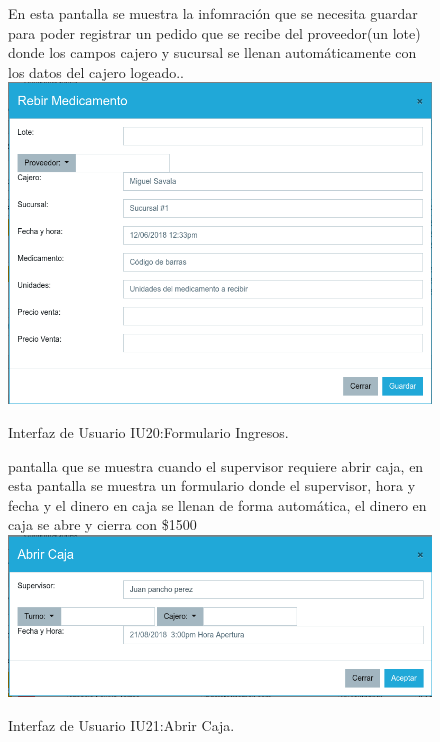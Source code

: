 \begin{figure}[htbp!]
	\begin{center}
	En esta pantalla se muestra la infomración que se necesita guardar para poder registrar un pedido que se recibe del proveedor(un lote) donde los campos cajero y sucursal se llenan automáticamente con los datos del cajero logeado..
\includegraphics[width=\textwidth]{Pantallas/FormularioIngreso}
		\caption{Interfaz de Usuario IU20:Formulario Ingresos.}
	\end{center}
\end{figure}


\begin{figure}[htbp!]
	\begin{center}
	pantalla que se muestra cuando el supervisor requiere abrir caja, en esta pantalla se muestra un formulario donde el supervisor, hora y fecha  y el dinero en caja se llenan de forma automática, el dinero en caja se abre y cierra con \$1500
\includegraphics[width=\textwidth]{Pantallas/AbrirCaja}
		\caption{Interfaz de Usuario IU21:Abrir Caja.}
	\end{center}
\end{figure}

